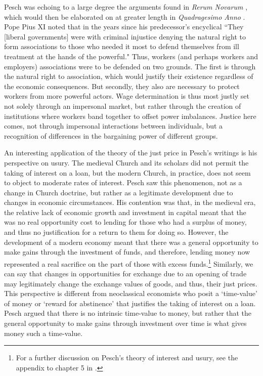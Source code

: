 \documentclass{article}
\begin{document}
Pesch was echoing to a large degree the arguments found in \emph{Rerum Novarum} \citep[no. 49]{leoxii1891}, which would then be elaborated on at greater length in \emph{Quadragesimo Anno} \citep[no. 29-30]{piusxi1931}.  Pope Pius XI noted that in the years since his predecessor’s encyclical ``They [liberal governments] were with criminal injustice denying the natural right to form associations to those who needed it most to defend themselves from ill treatment at the hands of the powerful."  Thus, workers (and perhaps workers and employers) associations were to be defended on two grounds.  The first is through the natural right to association, which would justify their existence regardless of the economic consequences.  But secondly, they also are necessary to protect workers from more powerful actors.  Wage determination is thus most justly set not solely through an impersonal market, but rather through the creation of institutions where workers band together to offset power imbalances.  Justice here comes, not through impersonal interactions between individuals, but a recognition of differences in the bargaining power of different groups.\medskip

An interesting application of the theory of the just price in Pesch’s writings is his perspective on usury.  The medieval Church and its scholars did not permit the taking of interest on a loan, but the modern Church, in practice, does not seem to object to moderate rates of interest.  Pesch saw this phenomenon, not as a change in Church doctrine, but rather as a legitimate development due to changes in economic circumstances.  His contention was that, in the medieval era, the relative lack of economic growth and investment in capital meant that the was no real opportunity cost to lending for those who had a surplus of money, and thus no justification for a return to them for doing so.  However, the development of a modern economy meant that there was a general opportunity to make gains through the investment of funds, and therefore, lending money now represented a real sacrifice on the part of those with excess funds.\footnote{For a further discussion on Pesch’s theory of interest and usury, see the appendix to chapter 5 in \citet{mulcahy1952}.}  Similarly, we can say that changes in opportunities for exchange due to an opening of trade may legitimately change the exchange values of goods, and thus, their just prices.  This perspective is different from neoclassical economists who posit a ‘time-value’ of money or ‘reward for abstinence’ that justifies the taking of interest on a loan.  Pesch argued that there is no intrinsic time-value to money, but rather that the general opportunity to make gains through investment over time is what gives money such a time-value.\medskip
\end{document}
